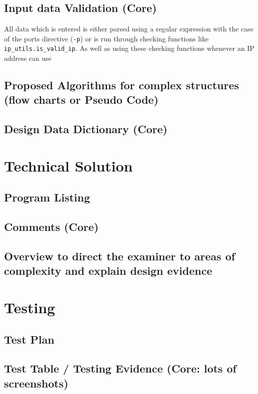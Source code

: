 \documentclass[titlepage]{article}
\begin{document}
\subsection{Input data Validation (Core)}

All data which is entered is either parsed using a regular expression with the case of the
ports directive (\verb|-p|) or is run through checking functions like \verb|ip_utils.is_valid_ip|.
As well as using these checking functions whenever an IP address can use

\subsection{Proposed Algorithms for complex structures (flow charts or Pseudo Code)}

\subsection{Design Data Dictionary (Core)}

\section{Technical Solution}

\subsection{Program Listing}

\subsection{Comments (Core)}

\subsection{Overview to direct the examiner to areas of complexity and explain design evidence}

\section{Testing}

\subsection{Test Plan}

\subsection{Test Table / Testing Evidence (Core: lots of screenshots)}
\end{document}
